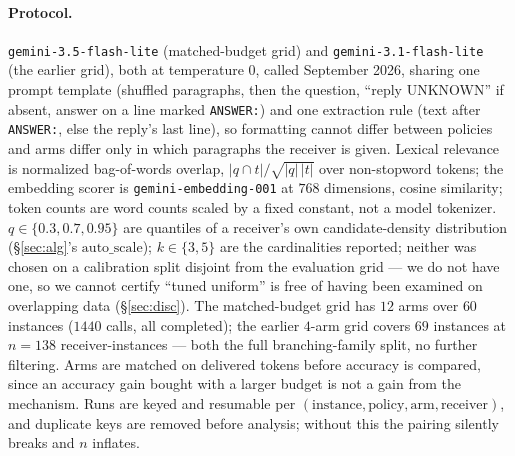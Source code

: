 \documentclass[sigconf,anonymous]{aamas}
\theoremstyle{remark}
\begin{document}
\paragraph{Protocol.} \texttt{gemini-3.5-flash-lite} (matched-budget
grid) and \texttt{gemini-3.1-flash-lite} (the earlier grid), both at
temperature $0$, called September 2026, sharing one prompt template
(shuffled paragraphs, then the question, ``reply UNKNOWN'' if absent,
answer on a line marked \texttt{ANSWER:}) and one extraction rule (text
after \texttt{ANSWER:}, else the reply's last line), so formatting
cannot differ between policies and arms differ only in which
paragraphs the receiver is given. Lexical relevance is normalized
bag-of-words overlap, $|q\cap t|/\sqrt{|q|\,|t|}$ over non-stopword
tokens; the embedding scorer is \texttt{gemini-embedding-001} at $768$
dimensions, cosine similarity; token counts are word counts scaled by
a fixed constant, not a model tokenizer. $q\in\{0.3,0.7,0.95\}$ are
quantiles of a receiver's own candidate-density distribution
(\S\ref{sec:alg}'s $\mathrm{auto\_scale}$); $k\in\{3,5\}$ are the
cardinalities reported; neither was chosen on a calibration split
disjoint from the evaluation grid --- we do not have one, so we cannot
certify ``tuned uniform'' is free of having been examined on
overlapping data (\S\ref{sec:disc}). The matched-budget grid has $12$
arms over $60$ instances ($1440$ calls, all completed); the earlier
$4$-arm grid covers $69$ instances at $n=138$ receiver-instances ---
both the full branching-family split, no further filtering. Arms are
matched on delivered tokens before accuracy is compared, since an
accuracy gain bought with a larger budget is not a gain from the
mechanism. Runs are keyed and resumable per
$(\text{instance}, \text{policy}, \text{arm}, \text{receiver})$, and
duplicate keys are removed before analysis; without this the pairing
silently breaks and $n$ inflates.
\end{document}
